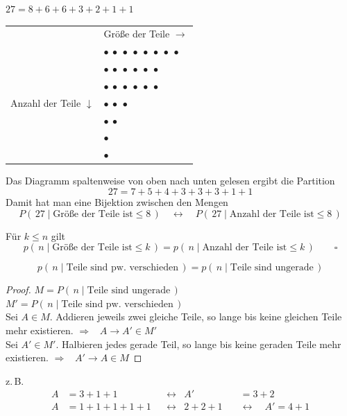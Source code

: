 \begin{beispiel}
$27 = 8 + 6 + 6 + 3 + 2 + 1 + 1$

\begin{center}
\begin{tabular}{r|l}
 & Größe der Teile $\rightarrow$ \\
 & $\bullet\ \bullet\ \bullet\ \bullet\ \bullet\ \bullet\ \bullet\ \bullet$ \\
 & $\bullet\ \bullet\ \bullet\ \bullet\ \bullet\ \bullet$ \\
 & $\bullet\ \bullet\ \bullet\ \bullet\ \bullet\ \bullet$ \\
Anzahl der Teile $\downarrow$ & $\bullet\ \bullet\ \bullet$ \\
 & $\bullet\ \bullet$ \\
 & $\bullet$ \\
 & $\bullet$ \\
\end{tabular}
\end{center}

Das Diagramm spaltenweise von oben nach unten gelesen ergibt die Partition
\[
27 = 7 + 5 + 4 + 3 + 3 + 3 + 1 + 1
\]
Damit hat man eine Bijektion zwischen den Mengen
\[
P(\,27 \mid \text{Größe der Teile ist} \le 8\,) \quad \longleftrightarrow \quad P(\,27 \mid \text{Anzahl der Teile ist} \le 8\,)
\]
\end{beispiel}

\begin{satz}
Für $k \le n$ gilt
\[
p(\,n \mid \text{Größe der Teile ist} \le k\,) = p(\,n \mid \text{Anzahl der Teile ist} \le k\,) \qquad \square
\]
\end{satz}

\begin{satz}
\[
p(\,n \mid \text{Teile sind pw.\ verschieden}\,) = p(\,n \mid \text{Teile sind ungerade}\,)
\]
\end{satz}

\begin{proof}
$M = P(\,n \mid \text{Teile sind ungerade}\,)$\\
$M' = P(\,n \mid \text{Teile sind pw.\ verschieden}\,)$\\
Sei $A \in M$.
Addieren jeweils zwei gleiche Teile, so lange bis keine gleichen Teile mehr existieren. \quad $\Rightarrow$ \ $A \to A' \in M'$\\
Sei $A' \in M'$. Halbieren jedes gerade Teil, so lange bis keine geraden Teile mehr existieren. \quad $\Rightarrow$ \ $A' \to A \in M$
\end{proof}

z.\,B.
\begin{align*}
A &= 3 + 1 + 1 & &\leftrightarrow & A' &= 3 + 2 \\
A &= 1 + 1 + 1 + 1 + 1 & &\leftrightarrow & 2 + 2 + 1 \quad &\leftrightarrow \quad A' = 4 + 1
\end{align*}
